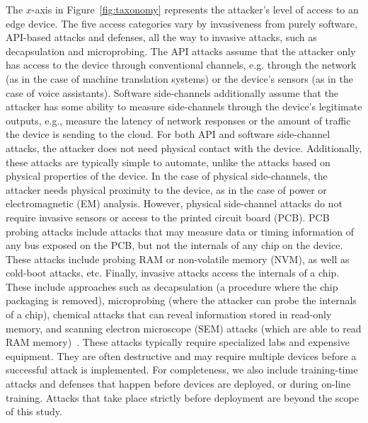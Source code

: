 The $x$-axis in Figure~\ref{fig:taxonomy} represents the attacker's level of access to an edge device. The five access categories vary by invasiveness from purely software, API-based attacks and defenses, all the way to invasive attacks, such as decapsulation and microprobing. 
The API attacks assume that the attacker only has access to the device through conventional channels, e.g. through the network (as in the case of machine translation systems) or the device's sensors (as in the case of voice assistants). Software side-channels additionally assume that the attacker has some ability to measure side-channels through the device's legitimate outputs, e.g., measure the latency of network responses or the amount of traffic the device is sending to the cloud. For both API and software side-channel attacks, the attacker does not need physical contact with the device. Additionally, these attacks are typically simple to automate, unlike the attacks based on physical properties of the device. In the case of physical side-channels, the attacker needs physical proximity to the device, as in the case of power or electromagnetic (EM) analysis. However, physical side-channel attacks do not require invasive sensors or access to the printed circuit board (PCB). PCB probing attacks include attacks that may measure data or timing information of any bus exposed on the PCB, but not the internals of any chip on the device. These attacks include probing RAM or non-volatile memory (NVM), as well as cold-boot attacks, etc. 
Finally, invasive attacks access the internals of a chip. These include approaches such as decapsulation (a procedure where the chip packaging is removed), microprobing (where the attacker can probe the internals of a chip), chemical attacks that can reveal information stored in read-only memory, and scanning electron microscope (SEM) attacks (which are able to read RAM memory)~. These attacks typically require specialized labs and expensive equipment. They are often destructive and may require multiple devices before a successful attack is implemented. For completeness, we also include training-time attacks and defenses that happen before devices are deployed, or during on-line training. 
Attacks that take place strictly before deployment are beyond the scope of this study.

